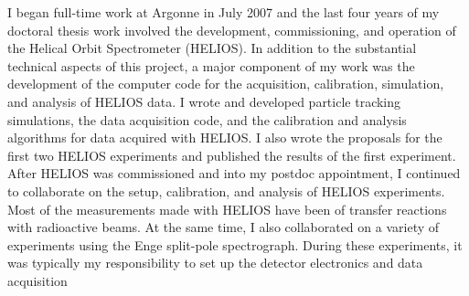 {I began full-time work at Argonne in July 2007 and the last four years of my doctoral thesis work involved the
 development, commissioning, and operation of the Helical Orbit Spectrometer (HELIOS).
In addition to the substantial technical aspects of this project,
 a major component of my work was the development of the computer code for the acquisition, calibration, simulation, and analysis of HELIOS data. 
I wrote and developed particle tracking simulations, %
 the data acquisition code, and %
 the calibration and analysis algorithms for data acquired with HELIOS. 
 I also wrote the proposals for the first two HELIOS experiments and published the results of the first experiment.
After HELIOS was commissioned and into my postdoc appointment, I continued to collaborate on %
the setup, calibration, and analysis of HELIOS experiments. %
Most of the measurements made with HELIOS have been of transfer reactions with radioactive beams.
At the same time, I also collaborated on a variety of experiments using the Enge split-pole spectrograph. During these experiments, it was typically my responsibility to set up the detector electronics and data acquisition 

}
